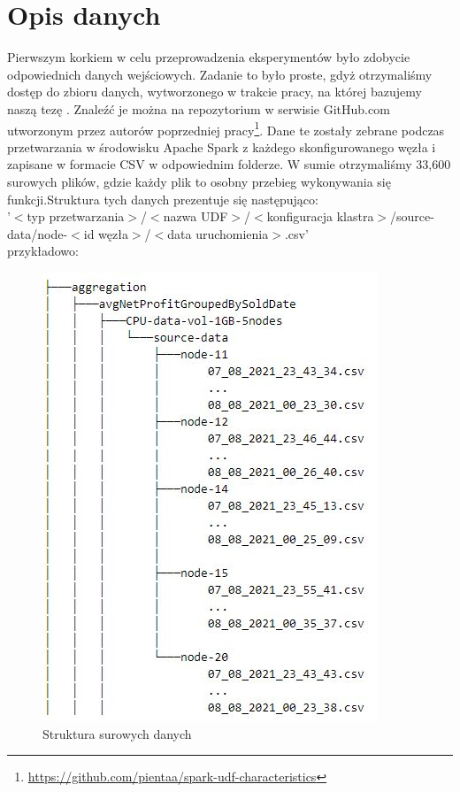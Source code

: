 \chapter{Opis danych}
\label{chap:opisdanych}
Pierwszym korkiem w celu przeprowadzenia eksperymentów było zdobycie odpowiednich danych wejściowych. Zadanie to było proste, gdyż otrzymaliśmy dostęp do zbioru danych, wytworzonego w trakcie pracy, na której bazujemy naszą tezę \cite{DBLP:conf/sigmod/BodzionyKPW21}. Znaleźć je można na repozytorium w serwisie GitHub.com utworzonym przez autorów poprzedniej pracy\footnote{\url{https://github.com/pientaa/spark-udf-characteristics}}.
Dane te zostały zebrane podczas przetwarzania w środowisku Apache Spark z każdego skonfigurowanego węzła i zapisane w formacie CSV w odpowiednim folderze. W sumie otrzymaliśmy 33,600 surowych plików, gdzie każdy plik to osobny przebieg wykonywania się funkcji.Struktura tych danych prezentuje się następująco:\\ 
\noindent'$<$typ przetwarzania$>$/$<$nazwa UDF$>$/$<$konfiguracja klastra$>$/source-data/node-$<$id węzła$>$/$<$data uruchomienia$>$.csv'\\
przykładowo:
\begin{figure}[H]
    \centering
    \captionsetup{justification=centering,margin=0.5cm}
    \includegraphics[scale=0.8]{figures/04-opis-danych/folder_structure.JPG}
    \caption{Struktura surowych danych}
    \label{fig:raw_file_structure}
\end{figure}
